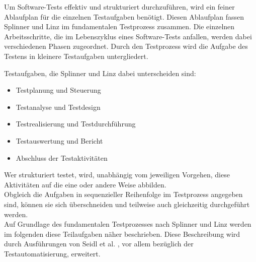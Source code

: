 Um Software-Tests effektiv und strukturiert durchzuführen, wird ein feiner Ablaufplan für die einzelnen Testaufgaben benötigt. Diesen Ablaufplan fassen Splinner und Linz \cite{spillner_basiswissen_2007} im fundamentalen Testprozess zusammen. Die einzelnen Arbeitsschritte, die im Lebenszyklus eines Software-Tests anfallen, werden dabei verschiedenen Phasen zugeordnet.
Durch den Testprozess wird die Aufgabe des Testens in kleinere Testaufgaben untergliedert.

Testaufgaben, die Splinner und Linz \cite{spillner_basiswissen_2007} dabei unterscheiden sind:

\begin{itemize}
	  \itemsep0pt
      \item Testplanung und Steuerung
      \item Testanalyse und Testdesign
      \item Testrealisierung und Testdurchführung
      \item Testauswertung und Bericht
      \item Abschluss der Testaktivitäten       
\end{itemize}

\glqq Wer strukturiert testet, wird, unabhängig vom jeweiligen Vorgehen, diese Aktivitäten auf die eine oder andere Weise abbilden.\grqq\ \cite[S. 9]{seidl_basiswissen_2012} \\
\glqq Obgleich die Aufgaben in sequenzieller Reihenfolge im Testprozess angegeben sind, können sie sich überschneiden und teilweise auch gleichzeitig durchgeführt werden.\grqq\ \cite[S.19]{spillner_basiswissen_2007} \\ Auf Grundlage des fundamentalen Testprozesses nach Splinner und Linz \cite[S.20ff]{spillner_basiswissen_2007} werden im folgenden diese Teilaufgaben näher beschrieben. 
Diese Beschreibung wird durch Ausführungen von Seidl et al. \cite[S. 9 ff.]{seidl_basiswissen_2012}, vor allem bezüglich der Testautomatisierung, erweitert. 

